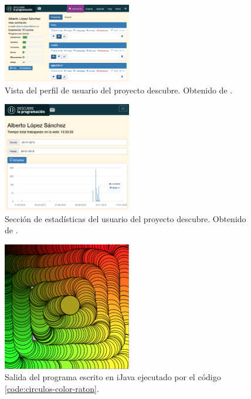 \begin{figure}[!ht]
	\begin{centering}
		\includegraphics[width=0.5\textwidth]{images/descubre-profile.png}
				\caption{Vista del perfil de usuario del proyecto \Gls{descubre}. Obtenido de \cite{descubre}.}
				\label{fig:descubre-perfil}
	\end{centering}
\end{figure}


\begin{figure}[!ht]
	\begin{centering}
		\includegraphics[width=0.5\textwidth]{images/descubre-statistics.png}
				\caption{Sección de estadísticas del usuario del proyecto \Gls{descubre}. Obtenido de \cite{descubre}.}
				\label{fig:descubre-estadisticas}
	\end{centering}
\end{figure}


\begin{figure}[!ht]
	\begin{centering}
		\includegraphics[width=0.5\textwidth]{images/salida-code-circulos-color-raton.png}
			\caption{Salida del programa escrito en iJava ejecutado por el código \ref{code:circulos-color-raton}.}
				\label{fig:salida-code-circulos-color-raton}
	\end{centering}
\end{figure}





